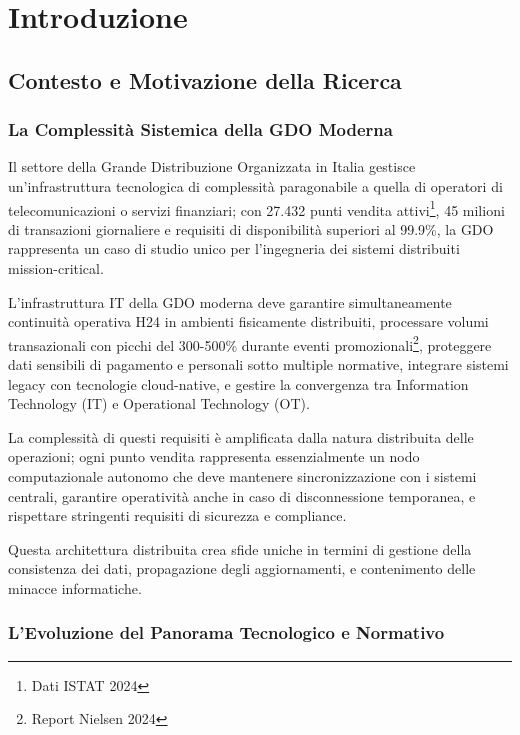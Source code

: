 \chapter{Introduzione}

\section{Contesto e Motivazione della Ricerca}

\subsection{La Complessità Sistemica della GDO Moderna}

Il settore della Grande Distribuzione Organizzata in Italia gestisce un'infrastruttura tecnologica di complessità paragonabile a quella di operatori di telecomunicazioni o servizi finanziari; con 27.432 punti vendita attivi\footnote{Dati ISTAT 2024}, 45 milioni di transazioni giornaliere e requisiti di disponibilità superiori al 99.9\%, la GDO rappresenta un caso di studio unico per l'ingegneria dei sistemi distribuiti mission-critical.

L'infrastruttura IT della GDO moderna deve garantire simultaneamente continuità operativa H24 in ambienti fisicamente distribuiti, processare volumi transazionali con picchi del 300-500\% durante eventi promozionali\footnote{Report Nielsen 2024}, proteggere dati sensibili di pagamento e personali sotto multiple normative, integrare sistemi legacy con tecnologie cloud-native, e gestire la convergenza tra Information Technology (IT) e Operational Technology (OT).

La complessità di questi requisiti è amplificata dalla natura distribuita delle operazioni; ogni punto vendita rappresenta essenzialmente un nodo computazionale autonomo che deve mantenere sincronizzazione con i sistemi centrali, garantire operatività anche in caso di disconnessione temporanea, e rispettare stringenti requisiti di sicurezza e compliance.

Questa architettura distribuita crea sfide uniche in termini di gestione della consistenza dei dati, propagazione degli aggiornamenti, e contenimento delle minacce informatiche.

\subsection{L'Evoluzione del Panorama Tecnologico e Normativo}

